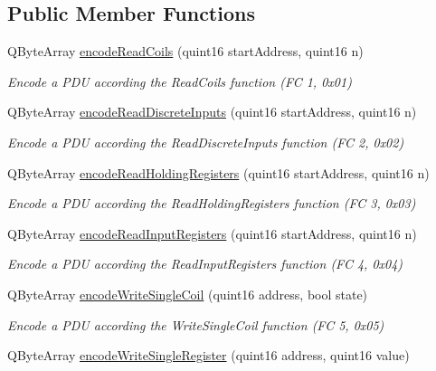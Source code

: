 \subsection*{Public Member Functions}
\begin{DoxyCompactItemize}
\item 
QByteArray \hyperlink{classmdt_frame_codec_modbus_adf0a4d583aeff7b818dda94514c594f0}{encodeReadCoils} (quint16 startAddress, quint16 n)
\begin{DoxyCompactList}\small\item\em Encode a PDU according the ReadCoils function (FC 1, 0x01) \end{DoxyCompactList}\item 
QByteArray \hyperlink{classmdt_frame_codec_modbus_ad14a2d6c124cca157670595978e06150}{encodeReadDiscreteInputs} (quint16 startAddress, quint16 n)
\begin{DoxyCompactList}\small\item\em Encode a PDU according the ReadDiscreteInputs function (FC 2, 0x02) \end{DoxyCompactList}\item 
QByteArray \hyperlink{classmdt_frame_codec_modbus_a19cac6dd7bd9078c6ab53ee2a891e537}{encodeReadHoldingRegisters} (quint16 startAddress, quint16 n)
\begin{DoxyCompactList}\small\item\em Encode a PDU according the ReadHoldingRegisters function (FC 3, 0x03) \end{DoxyCompactList}\item 
QByteArray \hyperlink{classmdt_frame_codec_modbus_aabcadb20524749274eaf285561960aed}{encodeReadInputRegisters} (quint16 startAddress, quint16 n)
\begin{DoxyCompactList}\small\item\em Encode a PDU according the ReadInputRegisters function (FC 4, 0x04) \end{DoxyCompactList}\item 
QByteArray \hyperlink{classmdt_frame_codec_modbus_a123f63422bb34fcb10ac653c0e89e79e}{encodeWriteSingleCoil} (quint16 address, bool state)
\begin{DoxyCompactList}\small\item\em Encode a PDU according the WriteSingleCoil function (FC 5, 0x05) \end{DoxyCompactList}\item 
QByteArray \hyperlink{classmdt_frame_codec_modbus_a9499bf48476368d030c015114f886ae3}{encodeWriteSingleRegister} (quint16 address, quint16 value)

\end{DoxyCompactItemize}
